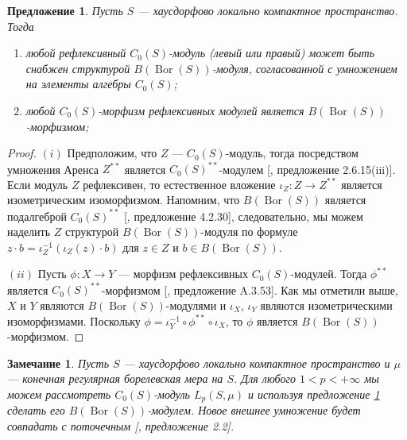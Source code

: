 \documentclass[12pt]{article}
\newtheorem{proposition}[theorem]{Предложение}
\newtheorem{remark}[theorem]{Замечание}
\begin{document}
\begin{proposition}\label{C0SMorphBtwnReflxSpIsBMorph}
    Пусть $S$ --- хаусдорфово локально компактное пространство. Тогда 
    \begin{enumerate}[label = (\roman*)]
        \item любой рефлексивный $C_0(S)$-модуль (левый или правый) может быть 
        снабжен структурой $B(\operatorname{Bor}(S))$-модуля, согласованной 
        с умножением на элементы алгебры $C_0(S)$;
        \item любой $C_0(S)$-морфизм рефлексивных модулей 
        является $B(\operatorname{Bor}(S))$-морфизмом;
    \end{enumerate}     
\end{proposition}
\begin{proof} 
    $(i)$ Предположим, что $Z$ --- $C_0(S)$-модуль, тогда посредством умножения 
    Аренса $Z^{**}$ является $C_0(S)^{**}$-модулем 
    [\cite{DalBanAlgAutCont}, предложение 2.6.15(iii)]. Если модуль $Z$ 
    рефлексивен, то естественное вложение $\iota_Z:Z\to Z^{**}$ является 
    изометрическим изоморфизмом. Напомним, что $B(\operatorname{Bor}(S))$ 
    является подалгеброй $C_0(S)^{**}$ 
    [\cite{DalBanAlgAutCont}, предложение 4.2.30], следовательно, мы можем 
    наделить $Z$ структурой $B(\operatorname{Bor}(S))$-модуля по 
    формуле $z\cdot b=\iota_Z^{-1}(\iota_Z(z)\cdot b)$ для $z\in Z$ 
    и $b\in B(\operatorname{Bor}(S))$.
    
    $(ii)$ Пусть $\phi:X\to Y$ --- морфизм рефлексивных $C_0(S)$-модулей. 
    Тогда $\phi^{**}$ является $C_0(S)^{**}$-морфизмом 
    [\cite{DalBanAlgAutCont}, предложение A.3.53]. Как мы отметили 
    выше, $X$ и $Y$ являются $B(\operatorname{Bor}(S))$-модулями 
    и $\iota_X$, $\iota_Y$ являются изометрическими изоморфизмами. 
    Поскольку $\phi=\iota_Y^{-1}\circ \phi^{**}\circ \iota_X$, то $\phi$ 
    является $B(\operatorname{Bor}(S))$-морфизмом.
\end{proof}

\begin{remark}\label{C0SModIsBBorSMod}
    Пусть $S$ --- хаусдорфово локально компактное пространство и $\mu$ --- 
    конечная регулярная борелевская мера на $S$. Для любого $1<p<+\infty$ мы 
    можем рассмотреть $C_0(S)$-модуль $L_p(S,\mu)$ и используя 
    предложение \ref{C0SMorphBtwnReflxSpIsBMorph} сделать 
    его $B(\operatorname{Bor}(S))$-модулем. Новое внешнее умножение будет 
    совпадать с поточечным [\cite{HelTensProdAndMultModLp}, предложение 2.2].
\end{remark}
\end{document}
